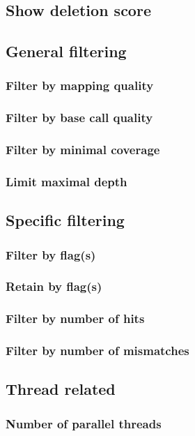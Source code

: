 \documentclass[10pt,a4paper,draft]{article}
\begin{document}
\subsection{Show deletion score}

\subsection{General filtering}
\subsubsection{Filter by mapping quality}

\subsubsection{Filter by base call quality}

\subsubsection{Filter by minimal coverage}

\subsubsection{Limit maximal depth}

\subsection{Specific filtering}
\subsubsection{Filter by flag(s)}
\subsubsection{Retain by flag(s)}

\subsubsection{Filter by number of hits}

\subsubsection{Filter by number of mismatches}

% 
\subsection{Thread related}
\subsubsection{Number of parallel threads}

\end{document}
